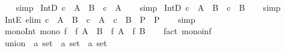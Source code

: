 \begin{isabellebody}
%
\isadelimproof
\ \ %
\endisadelimproof
%
\isatagproof
{}\isamarkupfalse%
\ simp%
\endisatagproof
{\isafoldproof}%
%
\isadelimproof
\isanewline
%
\endisadelimproof
\isanewline
{}\isamarkupfalse%
\ IntD{}{\isacharcolon}{\kern0pt}\ {\isachardoublequoteopen}c\ {\isasymin}\ A\ {\isasyminter}\ B\ {\isasymLongrightarrow}\ c\ {\isasymin}\ A{\isachardoublequoteclose}\isanewline
%
\isadelimproof
\ \ %
\endisadelimproof
%
\isatagproof
{}\isamarkupfalse%
\ simp%
\endisatagproof
{\isafoldproof}%
%
\isadelimproof
\isanewline
%
\endisadelimproof
\isanewline
{}\isamarkupfalse%
\ IntD{}{\isacharcolon}{\kern0pt}\ {\isachardoublequoteopen}c\ {\isasymin}\ A\ {\isasyminter}\ B\ {\isasymLongrightarrow}\ c\ {\isasymin}\ B{\isachardoublequoteclose}\isanewline
%
\isadelimproof
\ \ %
\endisadelimproof
%
\isatagproof
{}\isamarkupfalse%
\ simp%
\endisatagproof
{\isafoldproof}%
%
\isadelimproof
\isanewline
%
\endisadelimproof
\isanewline
{}\isamarkupfalse%
\ IntE\ {\isacharbrackleft}{\kern0pt}elim{\isacharbang}{\kern0pt}{\isacharbrackright}{\kern0pt}{\isacharcolon}{\kern0pt}\ {\isachardoublequoteopen}c\ {\isasymin}\ A\ {\isasyminter}\ B\ {\isasymLongrightarrow}\ {\isacharparenleft}{\kern0pt}c\ {\isasymin}\ A\ {\isasymLongrightarrow}\ c\ {\isasymin}\ B\ {\isasymLongrightarrow}\ P{\isacharparenright}{\kern0pt}\ {\isasymLongrightarrow}\ P{\isachardoublequoteclose}\isanewline
%
\isadelimproof
\ \ %
\endisadelimproof
%
\isatagproof
{}\isamarkupfalse%
\ simp%
\endisatagproof
{\isafoldproof}%
%
\isadelimproof
\isanewline
%
\endisadelimproof
\isanewline
{}\isamarkupfalse%
\ mono{\isacharunderscore}{\kern0pt}Int{\isacharcolon}{\kern0pt}\ {\isachardoublequoteopen}mono\ f\ {\isasymLongrightarrow}\ f\ {\isacharparenleft}{\kern0pt}A\ {\isasyminter}\ B{\isacharparenright}{\kern0pt}\ {\isasymsubseteq}\ f\ A\ {\isasyminter}\ f\ B{\isachardoublequoteclose}\isanewline
%
\isadelimproof
\ \ %
\endisadelimproof
%
\isatagproof
{}\isamarkupfalse%
\ {\isacharparenleft}{\kern0pt}fact\ mono{\isacharunderscore}{\kern0pt}inf{\isacharparenright}{\kern0pt}%
\endisatagproof
{\isafoldproof}%
%
\isadelimproof
%
\endisadelimproof
%
\isadelimdocument
%
\endisadelimdocument
%
\isatagdocument
%
\isamarkuptrue%
%
\endisatagdocument
{\isafolddocument}%
%
\isadelimdocument
%
\endisadelimdocument
{}\isamarkupfalse%
\ union\ {\isacharcolon}{\kern0pt}{\isacharcolon}{\kern0pt}\ {\isachardoublequoteopen}{\isacharprime}{\kern0pt}a\ set\ {\isasymRightarrow}\ {\isacharprime}{\kern0pt}a\ set\ {\isasymRightarrow}\ {\isacharprime}{\kern0pt}a\ set{\isachardoublequoteclose}\ \ {\isacharparenleft}{\kern0pt}\ {\isachardoublequoteopen}{\isasymunion}{\isachardoublequoteclose}\ {}{}{\isacharparenright}{\kern0pt}\isanewline

\end{isabellebody}
